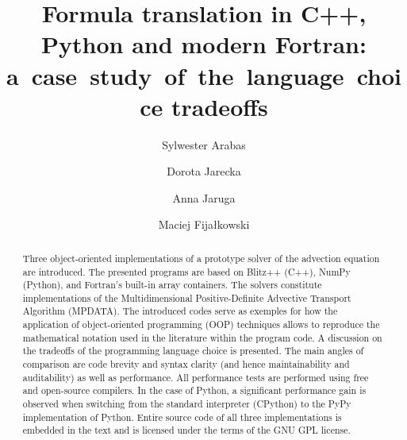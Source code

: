 \documentclass[gmd]{copernicus}%
\begin{document}
    \linenumbers

    \title{
      Formula translation in C++, Python and modern Fortran: a~case~study~of~the~language~choice tradeoffs
    }

    \author[1]{Sylwester Arabas}
    \author[1]{Dorota Jarecka}
    \author[1]{Anna Jaruga}
    \author[2]{Maciej Fijałkowski}



    \maketitle

    \begin{abstract}
        Three object-oriented implementations of a prototype solver of the advection equation are introduced.
        The presented programs are based on Blitz++ (C++), NumPy (Python), and Fortran's built-in array containers.
        The solvers constitute implementations of the Multidimensional Positive-Definite 
          Advective Transport Algorithm (MPDATA).
        The introduced codes serve as exemples for how the application of 
          object-oriented programming (OOP) techniques allows to reproduce the mathematical notation 
          used in the literature within the program code.
        A discussion on the tradeoffs of the programming language choice is presented.
        The main angles of comparison are code brevity and syntax clarity
          (and hence maintainability and auditability) as well as performance.
        All performance tests are performed using free and open-source compilers.
        In the case of Python, a significant performance gain is observed when switching from the standard 
          interpreter (CPython) to the PyPy implementation of Python.
        Entire source code of all three implementations is embedded in the text and is licensed
          under the terms of the GNU GPL license. 
    \end{abstract}

\end{document}
